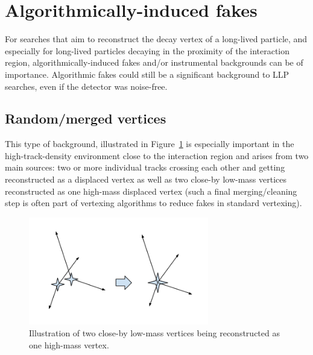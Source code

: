 \section{Algorithmically-induced fakes} %

For searches that aim to reconstruct the decay vertex of a long-lived particle, and especially for long-lived particles decaying in the proximity of the interaction region, algorithmically-induced fakes and/or instrumental backgrounds can be of importance. Algorithmic fakes could still be a significant background to LLP searches, even if the detector was noise-free.

\subsection{Random/merged vertices} %

This type of background, illustrated in Figure~\ref{fig:mergedvertices} is especially important in the high-track-density environment close to the interaction region and arises from two main sources: two or more individual tracks crossing each other and getting reconstructed as a displaced vertex as well as two close-by low-mass vertices reconstructed as one high-mass displaced vertex (such a final merging/cleaning step is often part of vertexing algorithms to reduce fakes in standard vertexing).

\begin{figure}[h]
  \centering
  \includegraphics[width=0.7\textwidth]{figures/mergedvertices.png}
  \caption{Illustration of two close-by low-mass vertices being reconstructed as one high-mass vertex.}
  \label{fig:mergedvertices}
\end{figure}

